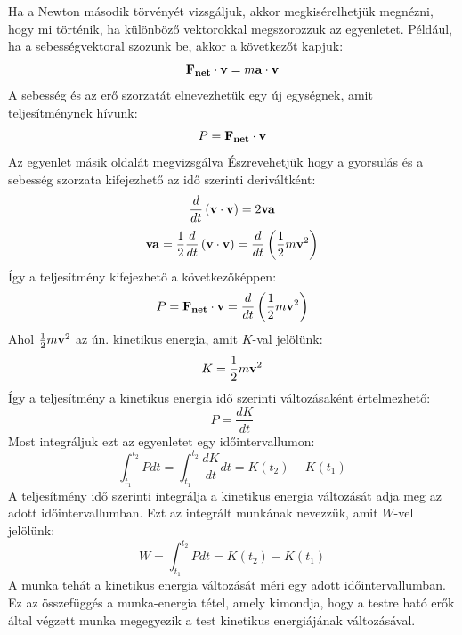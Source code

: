 \documentclass[a4paper,12pt]{article}
\begin{document}
Ha a Newton második törvényét vizsgáljuk, akkor megkisérelhetjük megnézni, hogy mi történik, ha különböző vektorokkal megszorozzuk az egyenletet. Például, ha a sebességvektoral szozunk be,
akkor a következőt kapjuk:
\begin{equation}
    \bold{F_{net}} \cdot \bold{v} = m\bold{a} \cdot \bold{v}
\end{equation}
A sebesség és az erő szorzatát elnevezhetük egy új egységnek, amit teljesítménynek hívunk:
\begin{equation}
    P = \bold{F_{net}} \cdot \bold{v}
\end{equation}
Az egyenlet másik oldalát megvizsgálva Észrevehetjük hogy a gyorsulás és a sebesség szorzata kifejezhető az idő szerinti deriváltként:
\begin{equation}
    \frac{d}{dt}\left(\bold{v} \cdot \bold{v}\right) = 2 \bold{v}\bold{a}
\end{equation}
\begin{equation}
    \bold{v}\bold{a} = \frac{1}{2} \frac{d}{dt}\left(\bold{v} \cdot \bold{v}\right) = \frac{d}{dt}\left(\frac{1}{2} m \bold{v}^2\right)
\end{equation}
Így a teljesítmény kifejezhető a következőképpen:
\begin{equation}
    P = \bold{F_{net}} \cdot \bold{v} = \frac{d}{dt}\left(\frac{1}{2} m \bold{v}^2\right)
\end{equation}
Ahol $\frac{1}{2} m \bold{v}^2$ az ún. kinetikus energia, amit $K$-val jelölünk:
\begin{equation}
    K = \frac{1}{2} m \bold{v}^2
\end{equation}
Így a teljesítmény a kinetikus energia idő szerinti változásaként értelmezhető:
\begin{equation}
    P = \frac{dK}{dt}
\end{equation}
Most integráljuk ezt az egyenletet egy időintervallumon:
\begin{equation}
    \int_{t_1}^{t_2} P dt = \int_{t_1}^{t_2} \frac{dK}{dt} dt = K(t_2) - K(t_1)
\end{equation}
A teljesítmény idő szerinti integrálja a kinetikus energia változását adja meg az adott időintervallumban. Ezt az integrált munkának nevezzük, amit $W$-vel jelölünk:
\begin{equation}
    W = \int_{t_1}^{t_2} P dt = K(t_2) - K(t_1)
\end{equation}
A munka tehát a kinetikus energia változását méri egy adott időintervallumban. Ez az összefüggés a munka-energia tétel, amely kimondja, hogy a testre ható erők által végzett munka megegyezik a test kinetikus energiájának változásával.
\end{document}
